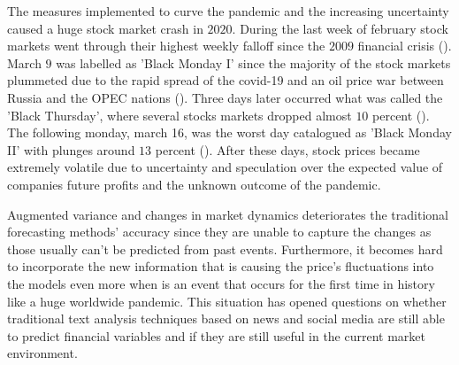 \documentclass[a4paper, 12pt]{report}
\begin{document}
    The measures implemented to curve the pandemic and the increasing uncertainty caused a huge stock market crash in $2020$. During the last week of february stock markets went through their highest weekly falloff since the $2009$ financial crisis (\textcite{Smith:2020}). March $9$ was labelled as 'Black Monday I' since the majority of the stock markets plummeted due to the rapid spread of the covid-19 and an oil price war between Russia and the OPEC nations (\textcite{He:2020}). Three days later occurred what was called the 'Black Thursday', where several stocks markets dropped almost $10$ percent (\textcite{Lopez:2020}). The following monday, march 16, was the worst day catalogued as 'Black Monday II' with plunges around $13$ percent (\textcite{Imbert:2020}). After these days, stock prices became extremely volatile due to uncertainty and speculation over the expected value of companies future profits and the unknown outcome of the pandemic. %
    
    Augmented variance and changes in market dynamics deteriorates the traditional forecasting methods’ accuracy since they are unable to capture the changes as those usually can't be predicted from past events. Furthermore, it becomes hard to incorporate the new information that is causing the price’s fluctuations into the models even more when is an event that occurs for the first time in history like a huge worldwide pandemic. This situation has opened questions on whether traditional text analysis techniques based on news and social media are still able to predict financial variables and if they are still useful in the current market environment. 
    
\end{document}
